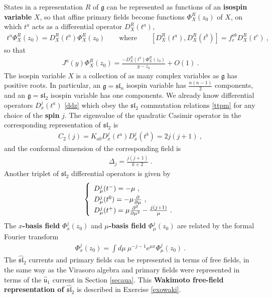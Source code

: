 \documentclass[12pt,a4paper,notitlepage]{report}
\numberwithin{equation}{section}
\theoremstyle{break}
\begin{document}
States in a representation $R$ of $\mathfrak{g}$ can be represented as functions of an \textbf{\boldmath isospin variable} $X$, so that affine primary fields become functions $\Phi^R_X(z_0)$ of $X$, on which $t^a$ acts as a differential operator $D_X^R(t^a)$, 
\begin{align}
 t^a \Phi^R_X(z_0) = D_X^R(t^a) \Phi^R_X(z_0) \qquad \text{where} \qquad [D_X^R(t^a),D_X^R(t^b)] = f^{ab}_c D_X^R(t^c)\ ,
\label{tpdp}
\end{align}
so that 
\begin{align}
 J^a(y)\Phi^R_X(z_0) = \frac{-D^R_X(t^a)\Phi^R_X(z_0)}{y-z_0}+O(1)\ .
\label{jprx}
\end{align}
The isospin variable $X$ is a collection of as many complex variables as $\mathfrak{g}$ has positive roots.
In particular, an $\mathfrak{g}=\mathfrak{sl}_n$ isospin variable has $\frac{n(n-1)}{2}$ components, and an $\mathfrak{g}=\mathfrak{sl}_2$ isospin variable has one components.
We already know differential operators $D^j_x(t^a)$ \eqref{ddz} which 
obey the $\mathfrak{sl}_2$ commutation relations \eqref{ttpm} for any choice of the 
\textbf{\boldmath spin} $j$.
The eigenvalue of the quadratic Casimir operator in the corresponding representation of $\mathfrak{sl}_2$ is
\begin{align}
 C_2(j) =  K_{ab}D_x^j(t^a)D_x^j(t^b) = 2j(j+1)\ ,
\end{align}
and the conformal dimension of the corresponding field is
\begin{align}
 \Delta_j =\frac{j(j+1)}{k+2}\ .
\label{dj}
\end{align}
Another triplet of $\mathfrak{sl}_2$ differential operators is given by 
\begin{align}
\renewcommand{\arraystretch}{1.3}
\left\{\begin{array}{l}  
 D_\mu^j(t^-) = -\mu \ , \\  D_\mu^j(t^0) = -\mu{\frac{\partial}{\partial \mu}} \ , \\ D_\mu^j(t^+) = \mu\frac{\partial^2}{\partial\mu^2} -\frac{j(j+1)}{\mu}\ . \end{array}\right. 
\label{mub}
\end{align}
The \textbf{\boldmath $x$-basis field} $\Phi^j_x(z_0)$ and \textbf{\boldmath $\mu$-basis field} $\Phi^j_\mu(z_0)$ are related by the formal Fourier transform
\begin{align}
 \Phi_x^j(z_0) = \int d\mu\ \mu^{-j-1}e^{\mu x} \Phi_\mu^j(z_0)\ .
\label{emx}
\end{align}
The $\widehat{\mathfrak{sl}}_2$ currents and primary fields can be represented in terms of free fields, in the same way as the Virasoro algebra and primary fields were represented in terms of the $\hat{\mathfrak{u}}_1$ current in Section \ref{secaua}.
This \textbf{Wakimoto free-field representation of $\widehat{\mathfrak{sl}}_2$} is described in Exercise \ref{exowaki}.
\end{document}
